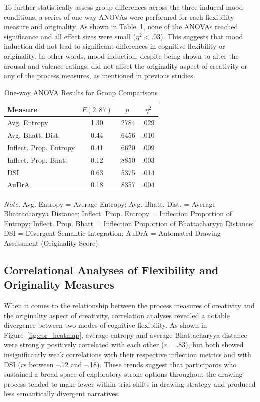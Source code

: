 \documentclass[../MA_Thesis.tex]{subfiles}
\begin{document}
To further statistically assess group differences across the three induced mood conditions, a series of one-way ANOVAs were performed for each flexibility measure and originality. As shown in Table~\ref{tab:anova_results}, none of the ANOVAs reached significance and all effect sizes were small ($\eta^2 < .03$). This suggests that mood induction did not lead to significant differences in cognitive flexibility or originality. In other words, mood induction, despite being shown to alter the arousal and valence ratings, did not affect the originality aspect of creativity or any of the process measures, as mentioned in previous studies. 

\begin{table}[H]
\centering
\begin{threeparttable}
\caption{One-way ANOVA Results for Group Comparisons}
\label{tab:anova_results}
\begin{tabular}{lccc}
\toprule
\textbf{Measure} & \textbf{$F(2, 87)$} & \textbf{$p$} & \textbf{$\eta^2$} \\
\midrule
Avg. Entropy & 1.30 & .2784 & .029 \\
Avg. Bhatt. Dist. & 0.44 & .6456 & .010 \\
Inflect. Prop. Entropy & 0.41 & .6620 & .009 \\
Inflect. Prop. Bhatt & 0.12 & .8850 & .003 \\
DSI & 0.63 & .5375 & .014 \\
AuDrA & 0.18 & .8357 & .004 \\
\bottomrule
\end{tabular}
\begin{tablenotes}[flushleft]
\small
\item \textit{Note.} Avg. Entropy = Average Entropy; Avg. Bhatt. Dist. = Average Bhattacharyya Distance; Inflect. Prop. Entropy = Inflection Proportion of Entropy; Inflect. Prop. Bhatt = Inflection Proportion of Bhattacharyya Distance; DSI = Divergent Semantic Integration; AuDrA = Automated Drawing Assessment (Originality Score).
\end{tablenotes}
\end{threeparttable}
\end{table}

\subsection*{Correlational Analyses of Flexibility and Originality Measures}

When it comes to the relationship between the process measures of creativity and the originality aspect of creativity, correlation analyses revealed a notable divergence between two modes of cognitive flexibility. As shown in Figure~\ref{fig:cor_heatmap}, average entropy and average Bhattacharyya distance were strongly positively correlated with each other ($r = .83$), but both showed insignificantly weak correlations with their respective inflection metrics and with DSI ($r$s between –.12 and –.18). These trends suggest that participants who sustained a broad space of exploratory stroke options throughout the drawing process tended to make fewer within-trial shifts in drawing strategy and produced less semantically divergent narratives.
\end{document}
